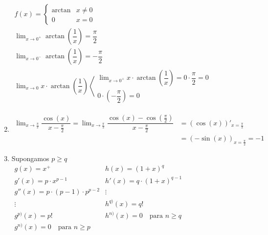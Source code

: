 \begin{enumerate}[label=\color{red}\textbf{\arabic*)}, leftmargin=*]
	$\begin{array}{l}
		f(x)=\begin{cases}
		\arctan & x\neq0\\
		0 & x=0
	\end{cases}\\
	\lim_{x\to0^+}\arctan\left(\dfrac{1}{x}\right)=\dfrac{\pi}{2}\\
	\lim_{x\to0^-}\arctan\left(\dfrac{1}{x}\right)=-\dfrac{\pi}{2}\\
	\lim_{x\to0}x\cdot\arctan\left(\dfrac{1}{x}\right)\left\langle\begin{array}{l}
		\lim_{x\to0^+}x\cdot\arctan\left(\dfrac{1}{x}\right)=0\cdot\dfrac{\pi}{2}=0\\
		0\cdot\left(-\dfrac{\pi}{2}\right)=0
	\end{array}\right.
	\end{array}$
	
\begin{center}
	\hspace{1cm}
\end{center}
	\item {}
	
	$\begin{aligned}
		\lim_{x\to\frac{\pi}{2}}\dfrac{\cos(x)}{x-\frac{\pi}{2}}=\lim_{x\to\frac{\pi}{2}}\dfrac{\cos(x)-\cos\left(\frac{\pi}{2}\right)}{x-\frac{\pi}{2}}&=\left(\cos(x)\right)'_{x=\frac{\pi}{2}}\\
		&=\left(-\sin(x)\right)_{x=\frac{\pi}{2}}=-1
	\end{aligned}$
	\item {}
	
	Supongamos $p\ge q$\\
	$\begin{array}{l|l}
		g(x)=x^+ & h(x)=(1+x)^q\\
		g'(x)=p\cdot x^{p-1} & h'(x)=q\cdot(1+x)^{q-1}\\
		g''(x)=p\cdot(p-1)\cdot p^{p-2} & \vdots\\
		\vdots & h^{q)}(x)=q!\\
		g^{p)}(x)=p! & h^{n)}(x)=0\quad\text{para }n\ge q\\
		g^{n)}(x)=0\quad\text{para }n\ge p &
	\end{array}$
	

\end{enumerate}
